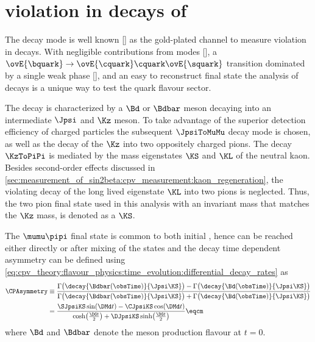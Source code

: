 
\section[
  head={\CP violation in decays of \BdToJpsiKS},
  tocentry={\CPHyperref violation in decays of \BdToJpsiKSHyperref}
]{\CPbfsf violation in decays of \BdToJpsiKSbfsf}
\label{sec:cpv_theory:bd2jpsiks}

The decay mode \BdToJpsiKS is well known [] as the gold-plated channel to measure
\CP violation in \Bd decays. With negligible contributions from \DCS
modes [], a $\ovE{\bquark}\to\ovE{\cquark}\cquark\ovE{\squark}$ transition
dominated by a single weak phase [], and an easy to reconstruct final state the
analysis of \BdToJpsiKS decays is a unique way to test the \SM quark flavour
sector.


The decay is characterized by a $\Bd$ or $\Bdbar$ meson decaying into an
intermediate $\Jpsi$ and $\Kz$ meson. To take advantage of the superior
detection efficiency of charged particles the subsequent $\JpsiToMuMu$ decay
mode is chosen, as well as the decay of the $\Kz$ into two oppositely charged
pions. The decay $\KzToPiPi$ is mediated by the mass eigenstates $\KS$ and $\KL$
of the neutral kaon. Besides second-order effects discussed in
\cref{sec:measurement_of_sin2beta:cpv_measurement:kaon_regeneration}, the \CP
violating decay of the long lived eigenstate $\KL$ into two pions is neglected.
Thus, the two pion final state used in this analysis with an invariant mass that
matches the $\Kz$ mass, is denoted as a $\KS$. 

The $\mumu\pipi$ final state is common to both initial \Bmesons, hence can be
reached either directly or after mixing of the \Bmeson states and the decay time
dependent \CP asymmetry \CPAsymmetry can be defined using
\cref{eq:cpv_theory:flavour_physics:time_evolution:differential_decay_rates} as
%
\begin{equation}\label{eq:cpv_theory:bd2jpsiks:cp_asymmetry}
  \begin{split}
    \CPAsymmetry &\equiv 
      \frac{\Gamma\bigl(\decay{\Bdbar(\obsTime)}{\Jpsi\KS}\bigr) - \Gamma\bigl(\decay{\Bd(\obsTime)}{\Jpsi\KS}\bigr)}
           {\Gamma\bigl(\decay{\Bdbar(\obsTime)}{\Jpsi\KS}\bigr) + \Gamma\bigl(\decay{\Bd(\obsTime)}{\Jpsi\KS}\bigr)} \\
                 &= \frac{\SJpsiKS\sin(\DMd t) - \CJpsiKS\cos(\DMd t)}{\cosh\bigl(\frac{\DG t}{2}\bigr) + \DJpsiKS\sinh\bigl(\frac{\DG t}{2}\bigr)} \eqcm
  \end{split}
\end{equation}
%
where $\Bd$ and $\Bdbar$ denote the meson production flavour at $t=0$.

